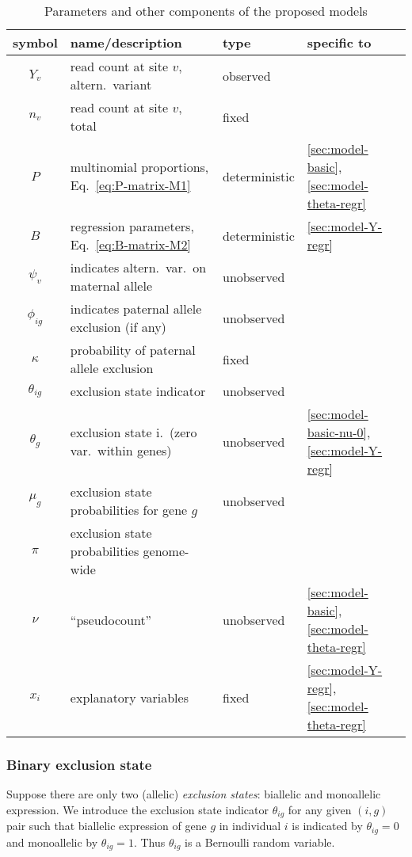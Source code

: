 \documentclass[letterpaper]{article}
\begin{document}
\begin{table}[t]
\begin{tabular}{clll}
symbol & name/description & type & specific to \\
\hline
\(Y_v\) & read count at site \(v\), altern.~variant & observed & \\
\(n_v\) & read count at site \(v\), total & fixed & \\
\(P\) & multinomial proportions, Eq.~\ref{eq:P-matrix-M1} & deterministic & \ref{sec:model-basic}, \ref{sec:model-theta-regr} \\
\(B\) & regression parameters, Eq.~\ref{eq:B-matrix-M2} & deterministic & \ref{sec:model-Y-regr} \\
\(\psi_v\) & indicates altern.~var.~on maternal allele & unobserved & \\
\(\phi_{ig}\) & indicates paternal allele exclusion (if any) & unobserved & \\
\(\kappa\) & probability of paternal allele exclusion & fixed & \\
\(\theta_{ig}\) & exclusion state indicator & unobserved & \\
\(\theta_g\) & exclusion state i.~(zero var.~within genes) & unobserved & \ref{sec:model-basic-nu-0},
\ref{sec:model-Y-regr} \\
\(\mu_g\) & exclusion state probabilities for gene \(g\) & unobserved & \\
\(\pi\) & exclusion state probabilities genome-wide & & \\
\(\nu\) & ``pseudocount'' & unobserved & \ref{sec:model-basic}, \ref{sec:model-theta-regr} \\
\(x_i\) & explanatory variables & fixed & \ref{sec:model-Y-regr}, \ref{sec:model-theta-regr} \\
\hline
\end{tabular}
\caption{
Parameters and other components of the proposed models
}
\label{tab:parameters}
\end{table}

\subsubsection{Binary exclusion state}
\label{sec:local-binary}

Suppose there are only two (allelic) \emph{exclusion states}: biallelic and
monoallelic expression.  We introduce the exclusion state indicator
\(\theta_{ig}\) for any given \((i,g)\) pair such that biallelic expression of
gene \(g\) in individual \(i\) is indicated by \(\theta_{ig}=0\) and
monoallelic by \(\theta_{ig}=1\).  Thus \(\theta_{ig}\) is a Bernoulli random
variable.
\end{document}
